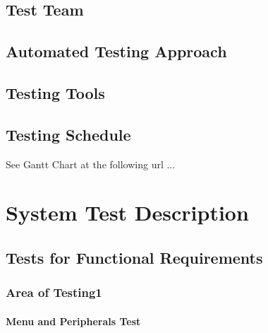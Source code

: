 \documentclass[12pt, titlepage]{article}
\begin{document}
\subsection{Test Team}


\subsection{Automated Testing Approach}


\subsection{Testing Tools}


\subsection{Testing Schedule}

	
See Gantt Chart at the following url ...

\section{System Test Description}
	
\subsection{Tests for Functional Requirements}

\subsubsection{Area of Testing1}
		
\paragraph{Menu and Peripherals Test}
\end{document}

